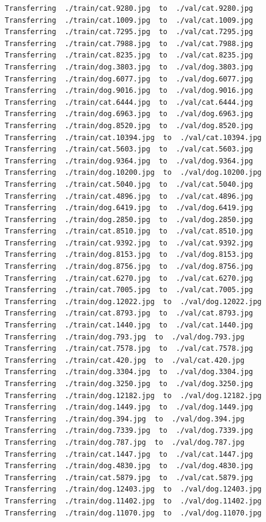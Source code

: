 \documentclass[]{book}
\theoremstyle{definition}
\theoremstyle{definition}
\theoremstyle{definition}
\theoremstyle{remark}
\begin{document}
\begin{verbatim}
Transferring  ./train/cat.9280.jpg  to  ./val/cat.9280.jpg
Transferring  ./train/cat.1009.jpg  to  ./val/cat.1009.jpg
Transferring  ./train/cat.7295.jpg  to  ./val/cat.7295.jpg
Transferring  ./train/cat.7988.jpg  to  ./val/cat.7988.jpg
Transferring  ./train/cat.8235.jpg  to  ./val/cat.8235.jpg
Transferring  ./train/dog.3803.jpg  to  ./val/dog.3803.jpg
Transferring  ./train/dog.6077.jpg  to  ./val/dog.6077.jpg
Transferring  ./train/dog.9016.jpg  to  ./val/dog.9016.jpg
Transferring  ./train/cat.6444.jpg  to  ./val/cat.6444.jpg
Transferring  ./train/dog.6963.jpg  to  ./val/dog.6963.jpg
Transferring  ./train/dog.8520.jpg  to  ./val/dog.8520.jpg
Transferring  ./train/cat.10394.jpg  to  ./val/cat.10394.jpg
Transferring  ./train/cat.5603.jpg  to  ./val/cat.5603.jpg
Transferring  ./train/dog.9364.jpg  to  ./val/dog.9364.jpg
Transferring  ./train/dog.10200.jpg  to  ./val/dog.10200.jpg
Transferring  ./train/cat.5040.jpg  to  ./val/cat.5040.jpg
Transferring  ./train/cat.4896.jpg  to  ./val/cat.4896.jpg
Transferring  ./train/dog.6419.jpg  to  ./val/dog.6419.jpg
Transferring  ./train/dog.2850.jpg  to  ./val/dog.2850.jpg
Transferring  ./train/cat.8510.jpg  to  ./val/cat.8510.jpg
Transferring  ./train/cat.9392.jpg  to  ./val/cat.9392.jpg
Transferring  ./train/dog.8153.jpg  to  ./val/dog.8153.jpg
Transferring  ./train/dog.8756.jpg  to  ./val/dog.8756.jpg
Transferring  ./train/cat.6270.jpg  to  ./val/cat.6270.jpg
Transferring  ./train/cat.7005.jpg  to  ./val/cat.7005.jpg
Transferring  ./train/dog.12022.jpg  to  ./val/dog.12022.jpg
Transferring  ./train/cat.8793.jpg  to  ./val/cat.8793.jpg
Transferring  ./train/cat.1440.jpg  to  ./val/cat.1440.jpg
Transferring  ./train/dog.793.jpg  to  ./val/dog.793.jpg
Transferring  ./train/cat.7578.jpg  to  ./val/cat.7578.jpg
Transferring  ./train/cat.420.jpg  to  ./val/cat.420.jpg
Transferring  ./train/dog.3304.jpg  to  ./val/dog.3304.jpg
Transferring  ./train/dog.3250.jpg  to  ./val/dog.3250.jpg
Transferring  ./train/dog.12182.jpg  to  ./val/dog.12182.jpg
Transferring  ./train/dog.1449.jpg  to  ./val/dog.1449.jpg
Transferring  ./train/dog.394.jpg  to  ./val/dog.394.jpg
Transferring  ./train/dog.7339.jpg  to  ./val/dog.7339.jpg
Transferring  ./train/dog.787.jpg  to  ./val/dog.787.jpg
Transferring  ./train/cat.1447.jpg  to  ./val/cat.1447.jpg
Transferring  ./train/dog.4830.jpg  to  ./val/dog.4830.jpg
Transferring  ./train/cat.5879.jpg  to  ./val/cat.5879.jpg
Transferring  ./train/dog.12403.jpg  to  ./val/dog.12403.jpg
Transferring  ./train/dog.11402.jpg  to  ./val/dog.11402.jpg
Transferring  ./train/dog.11070.jpg  to  ./val/dog.11070.jpg

\end{verbatim}
\end{document}
